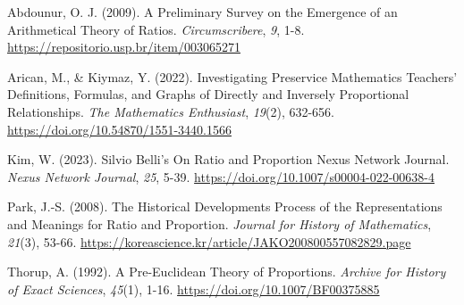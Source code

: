 \documentclass[
  stu,
  floatsintext,
  longtable,
  a4paper,
  nolmodern,
  notxfonts,
  notimes,
  12pt,
  colorlinks=true,linkcolor=blue,citecolor=blue,urlcolor=blue]{apa7}
\newlength{\cslhangindent}
\newenvironment{CSLReferences}[2] %
 {\begin{list}{}{%
  \setlength{\itemindent}{0pt}
  \setlength{\leftmargin}{0pt}
  \setlength{\parsep}{0pt}
  \ifodd #1
   \setlength{\leftmargin}{\cslhangindent}
   \setlength{\itemindent}{-1\cslhangindent}
  \fi
  \setlength{\itemsep}{#2\baselineskip}}}
 {\end{list}}
\begin{document}
\protect{}\label{refs}
\begin{CSLReferences}{1}{0}
Abdounur, O. J. (2009). A Preliminary Survey on the Emergence of an
Arithmetical Theory of Ratios. \emph{Circumscribere}, \emph{9}, 1-8.
\url{https://repositorio.usp.br/item/003065271}

Arican, M., \& Kiymaz, Y. (2022). Investigating {Preservice Mathematics
Teachers}' {Definitions}, {Formulas}, and {Graphs} of {Directly} and
{Inversely Proportional Relationships}. \emph{The Mathematics
Enthusiast}, \emph{19}(2), 632-656.
\url{https://doi.org/10.54870/1551-3440.1566}

Kim, W. (2023). Silvio {Belli}'s {On Ratio} and {Proportion} \textbar{}
{Nexus Network Journal}. \emph{Nexus Network Journal}, \emph{25}, 5-39.
\url{https://doi.org/10.1007/s00004-022-00638-4}

Park, J.-S. (2008). The Historical Developments Process of the
Representations and Meanings for Ratio and Proportion. \emph{Journal for
History of Mathematics}, \emph{21}(3), 53-66.
\url{https://koreascience.kr/article/JAKO200800557082829.page}

Thorup, A. (1992). A Pre-Euclidean Theory of Proportions. \emph{Archive
for History of Exact Sciences}, \emph{45}(1), 1-16.
\url{https://doi.org/10.1007/BF00375885}

\end{CSLReferences}
\end{document}
